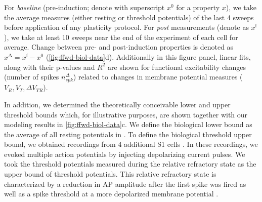 For \textit{baseline} (pre-induction; denote with superscript $x^{\mathrm{0}}$ for a property $x$),
        we take the average measures (either resting or threshold potentials)
        of the last 4 sweeps before application of any plasticity protocol.
    For \textit{post} measurements (denote as $x^{\mathrm{f}}$),
        we take at least 10 sweeps near the end of the experiment of each cell for average.
    Change between pre- and post-induction properties is denoted as
        $x^{\mathrm{\Delta}} = x^{\mathrm{f}} - x^{\mathrm{0}}$
        (\autoref{fig:ffwd-biol-data}d).
    Additionally in this figure panel, linear fits, along with their p-values and $R^2$
        are shown for functional excitability changes
        (number of spikes $n_{spk}^{\Delta}$)
        related to changes in membrane potential measures ($V_R, V_T, \Delta V_{TR}$).

In addition, we determined the theoretically conceivable lower and upper threshold bounds
        which, for illustrative purposes, are shown together
        with our modeling results in \autoref{fig:ffwd-biol-data}c.
    We define the biological lower bound
        as the average of all resting potentials in \cite{Gill2020-wy}.
    To define the biological threshold upper bound,
        we obtained recordings from 4 additional S1 cells
        \citep[same recording conditions as in][]{Gill2020-wy}.
    In these recordings, we evoked multiple action potentials
        by injecting depolarizing current pulses.
    We took the threshold potentials measured
        during the relative refractory state
        as the upper bound of threshold potentials.
    This relative refractory state is characterized
        by a reduction in AP amplitude after the first spike was fired
        as well as a spike threshold at a more depolarized membrane potential
        .

